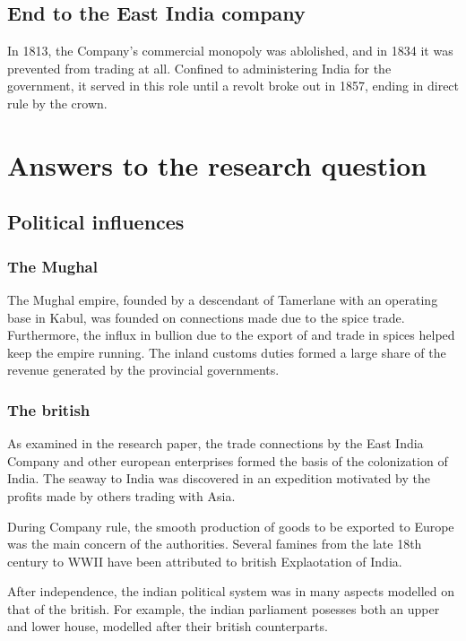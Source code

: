 \documentclass[11pt, a4paper, headings=standardclasses]{scrartcl}
\begin{document}
\subsection{End to the East India company}

In 1813, the Company's commercial monopoly was ablolished, and in 1834 it was prevented from trading at all. Confined to administering India for the government, it served in this role until a revolt broke out in 1857, ending in direct rule by the crown.\autocite{parliament}

\section{Answers to the research question}

\subsection{Political influences}
\subsubsection{The Mughal}

The Mughal empire, founded by a descendant of Tamerlane\autocite[6]{richards} with an operating base in Kabul, was founded on connections made due to the spice trade. Furthermore, the influx in bullion due to the export of and trade in spices helped keep the empire running. The inland customs duties formed a large share of the revenue generated by the provincial governments.\autocite[257]{RF}

\subsubsection{The british}

As examined in the research paper, the trade connections by the East India Company and other european enterprises formed the basis of the colonization of India. The seaway to India was discovered in an expedition motivated by the profits made by others trading with Asia.

During Company rule, the smooth production of goods to be exported to Europe was the main concern of the authorities. Several famines from the late 18th century to WWII have been attributed to british Explaotation of India.\autocite{td}

After independence, the indian political system was in many aspects modelled on that of the british. For example, the indian parliament posesses both an upper and lower house, modelled after their british counterparts.
\end{document}
